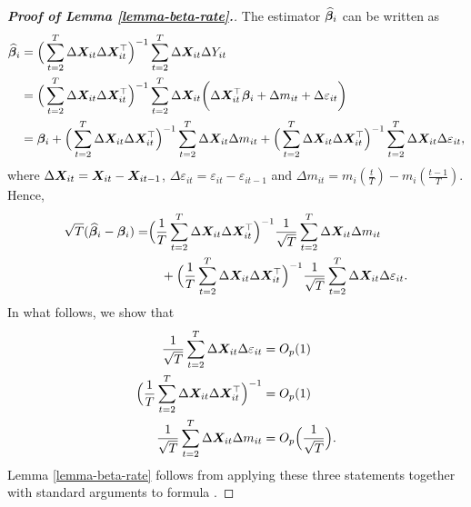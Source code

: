 \documentclass[12pt]{article}
\makeatletter
\renewcommand{\eqref}[1]{\tagform@{\ref{#1}}}
\makeatother
\begin{document}
\begin{proof}[\textnormal{\textbf{Proof of Lemma \ref{lemma-beta-rate}.}}]
The estimator $\widehat{\bm{\beta}}_i$ can be written as
\begin{align*}
\widehat{\bm{\beta}}_i &= \Big( \sum_{t=2}^T \Delta \boldsymbol{X}_{it} \Delta \boldsymbol{X}_{it}^\top \Big)^{-1} \sum_{t=2}^T \Delta \boldsymbol{X}_{it} \Delta Y_{it} \\
& =  \Big( \sum_{t=2}^T \Delta \boldsymbol{X}_{it} \Delta \boldsymbol{X}_{it}^\top \Big)^{-1} \sum_{t=2}^T \Delta \boldsymbol{X}_{it} \bigg(\Delta \boldsymbol{X}_{it}^\top \bm{\beta}_i +  \Delta m_{it}+ \Delta \varepsilon_{it} \bigg) \\
&= \bm{\beta}_i + \Big( \sum_{t=2}^T \Delta \boldsymbol{X}_{it} \Delta \boldsymbol{X}_{it}^\top \Big)^{-1} \sum_{t=2}^T \Delta \boldsymbol{X}_{it} \Delta m_{it} +  \Big( \sum_{t=2}^T \Delta \boldsymbol{X}_{it} \Delta \boldsymbol{X}_{it}^\top \Big)^{-1} \sum_{t=2}^T \Delta \boldsymbol{X}_{it} \Delta \varepsilon_{it}, 
\end{align*}
where $\Delta \boldsymbol{X}_{it} = \boldsymbol{X}_{it} - \boldsymbol{X}_{it-1}$, $\Delta \varepsilon_{it} = \varepsilon_{it} - \varepsilon_{it-1}$ and $\Delta m_{it} = m_i (\frac{t}{T}) - m_i(\frac{t-1}{T})$. Hence, 
\begin{align}
 \sqrt{T}( \widehat{\bm{\beta}}_i - \bm{\beta}_i) = &\Big( \frac{1}{T}\sum_{t=2}^T \Delta \boldsymbol{X}_{it} \Delta \boldsymbol{X}_{it}^\top \Big)^{-1} \frac{1}{\sqrt{T}}\sum_{t=2}^T \Delta \boldsymbol{X}_{it} \Delta m_{it} \nonumber \\
&\quad+  \Big(\frac{1}{T} \sum_{t=2}^T \Delta \boldsymbol{X}_{it} \Delta \boldsymbol{X}_{it}^\top \Big)^{-1}\frac{1}{\sqrt{T}} \sum_{t=2}^T \Delta \boldsymbol{X}_{it} \Delta \varepsilon_{it}. \label{theo:beta:proof1}
\end{align}
In what follows, we show that 
\begin{align}
\frac{1}{\sqrt{T}} \sum_{t=2}^T \Delta \boldsymbol{X}_{it} \Delta \varepsilon_{it} & = O_p(1) \label{lemma-beta-rate-claim1} \\
\Big( \frac{1}{T}\sum_{t=2}^T \Delta \boldsymbol{X}_{it} \Delta \boldsymbol{X}_{it}^\top \Big)^{-1} & = O_p(1) \label{lemma-beta-rate-claim2} \\
\frac{1}{\sqrt{T}} \sum_{t=2}^T \Delta \boldsymbol{X}_{it} \Delta m_{it} & = O_p\Big(\frac{1}{\sqrt{T}}\Big). \label{lemma-beta-rate-claim3}
\end{align} 
Lemma \ref{lemma-beta-rate} follows from applying these three statements together with standard arguments to formula \eqref{theo:beta:proof1}.



\end{proof}
\end{document}
